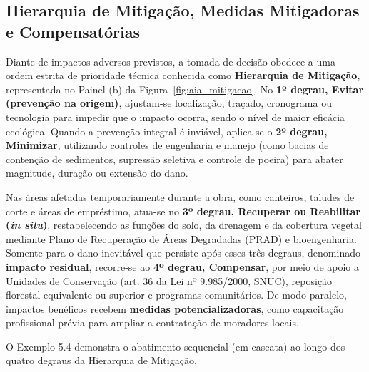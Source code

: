 \subsection{Hierarquia de Mitigação, Medidas Mitigadoras e Compensatórias}

Diante de impactos adversos previstos, a tomada de decisão obedece a uma ordem estrita de prioridade técnica conhecida como \textbf{Hierarquia de Mitigação}, representada no Painel (b) da Figura~\ref{fig:aia_mitigacao}. No \textbf{1º degrau, Evitar (prevenção na origem)}, ajustam-se localização, traçado, cronograma ou tecnologia para impedir que o impacto ocorra, sendo o nível de maior eficácia ecológica. Quando a prevenção integral é inviável, aplica-se o \textbf{2º degrau, Minimizar}, utilizando controles de engenharia e manejo (como bacias de contenção de sedimentos, supressão seletiva e controle de poeira) para abater magnitude, duração ou extensão do dano.

Nas áreas afetadas temporariamente durante a obra, como canteiros, taludes de corte e áreas de empréstimo, atua-se no \textbf{3º degrau, Recuperar ou Reabilitar (\textit{in situ})}, restabelecendo as funções do solo, da drenagem e da cobertura vegetal mediante Plano de Recuperação de Áreas Degradadas (PRAD) e bioengenharia. Somente para o dano inevitável que persiste após esses três degraus, denominado \textbf{impacto residual}, recorre-se ao \textbf{4º degrau, Compensar}, por meio de apoio a Unidades de Conservação (art. 36 da Lei nº 9.985/2000, SNUC), reposição florestal equivalente ou superior e programas comunitários. De modo paralelo, impactos benéficos recebem \textbf{medidas potencializadoras}, como capacitação profissional prévia para ampliar a contratação de moradores locais.

O Exemplo 5.4 demonstra o abatimento sequencial (em cascata) ao longo dos quatro degraus da Hierarquia de Mitigação.

